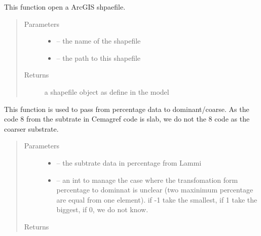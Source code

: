 \documentclass[letterpaper,10pt,english]{sphinxmanual}
\begin{document}
\begin{fulllineitems}
\label{\detokenize{index:src.substrate.open_shp}}
This function open a ArcGIS shpaefile.
\begin{quote}\begin{description}
\item[{Parameters}] \leavevmode\begin{itemize}
\item {} 
 -- the name of the shapefile

\item {} 
 -- the path to this shapefile

\end{itemize}

\item[{Returns}] \leavevmode
a shapefile object as define in the model

\end{description}\end{quote}

\end{fulllineitems}


\begin{fulllineitems}
\label{\detokenize{index:src.substrate.percentage_to_domcoarse}}
This function is used to pass from percentage data to dominant/coarse. As the code 8 from the subtrate in
Cemagref code is slab, we do not the 8 code as the coarser substrate.
\begin{quote}\begin{description}
\item[{Parameters}] \leavevmode\begin{itemize}
\item {} 
 -- the subtrate data in percentage from Lammi

\item {} 
 -- an int to manage the case where the transfomation form percentage to dominnat is unclear (two
maxinimum percentage are equal from one element). if -1 take the smallest, if 1 take the biggest,
if 0, we do not know.

\end{itemize}

\item[{Returns}] \leavevmode


\end{description}\end{quote}

\end{fulllineitems}
\end{document}
